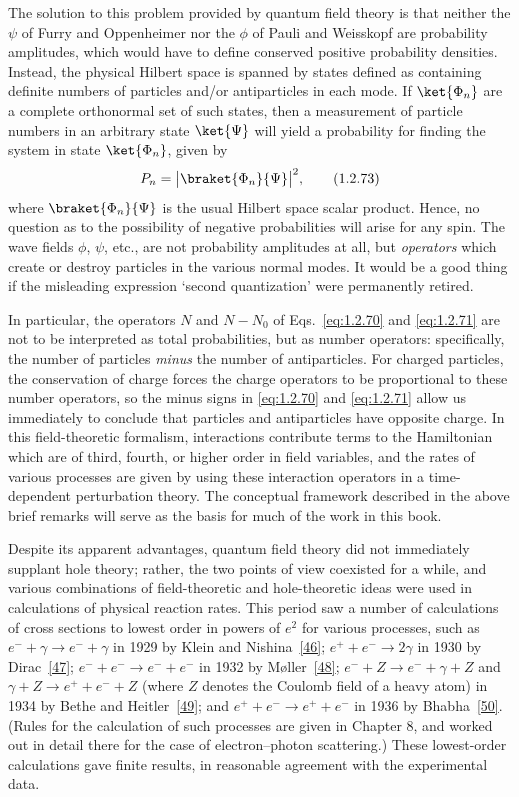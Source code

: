 The solution to this problem provided by quantum field theory is that neither
the $\psi$ of Furry and Oppenheimer nor the $\phi$ of Pauli and Weisskopf are
probability amplitudes, which would have to define conserved positive
probability densities. Instead, the physical Hilbert space is spanned by
states defined as containing definite numbers of particles and/or
antiparticles in each mode. If $\ket{\Phi_n}$ are a complete orthonormal set
of such states, then a measurement of particle numbers in an arbitrary state
$\ket{\Psi}$ will yield a probability for finding the system in state
$\ket{\Phi_n}$, given by
\begin{equation}
  P_n=\bigl|\braket{\Phi_n}{\Psi}\bigr|^2,
  \tag{1.2.73}\label{eq:1.2.73}
\end{equation}
where $\braket{\Phi_n}{\Psi}$ is the usual Hilbert space scalar product.
Hence, no question as to the possibility of negative probabilities will arise
for any spin. The wave fields $\phi$, $\psi$, etc., are not probability
amplitudes at all, but \emph{operators} which create or destroy particles in
the various normal modes. It would be a good thing if the misleading
expression `second quantization' were permanently retired.

In particular, the operators $N$ and $N-N_0$ of Eqs.~\eqref{eq:1.2.70} and \eqref{eq:1.2.71}
are not to be interpreted as total probabilities, but as number operators:
specifically, the number of particles \emph{minus} the number of antiparticles.
For charged particles, the conservation of charge forces the charge operators
to be proportional to these number operators, so the minus signs in \eqref{eq:1.2.70}
and \eqref{eq:1.2.71} allow us immediately to conclude that particles and
antiparticles have opposite charge. In this field-theoretic formalism,
interactions contribute terms to the Hamiltonian which are of third, fourth,
or higher order in field variables, and the rates of various processes are
given by using these interaction operators in a time-dependent perturbation
theory. The conceptual framework described in the above brief remarks will
serve as the basis for much of the work in this book.

Despite its apparent advantages, quantum field theory did not immediately
supplant hole theory; rather, the two points of view coexisted for a while,
and various combinations of field-theoretic and hole-theoretic ideas were used
in calculations of physical reaction rates. This period saw a number of
calculations of cross sections to lowest order in powers of $e^2$ for various
processes, such as $e^-+\gamma\to e^-+\gamma$ in 1929 by Klein and
Nishina~\hyperref[ref:1.46]{[46]}; $e^++e^-\to2\gamma$ in 1930 by Dirac~\hyperref[ref:1.47]{[47]};
$e^-+e^-\to e^-+e^-$ in 1932 by M\o ller~\hyperref[ref:1.48]{[48]};
$e^-+Z\to e^-+\gamma+Z$ and $\gamma+Z\to e^++e^-+Z$ (where $Z$ denotes
the Coulomb field of a heavy atom) in 1934 by Bethe and Heitler~\hyperref[ref:1.49]{[49]}; and
$e^++e^-\to e^++e^-$ in 1936 by Bhabha~\hyperref[ref:1.50]{[50]}. (Rules for the calculation of
such processes are given in Chapter 8, and worked out in detail there for the
case of electron--photon scattering.) These lowest-order calculations gave
finite results, in reasonable agreement with the experimental data.

